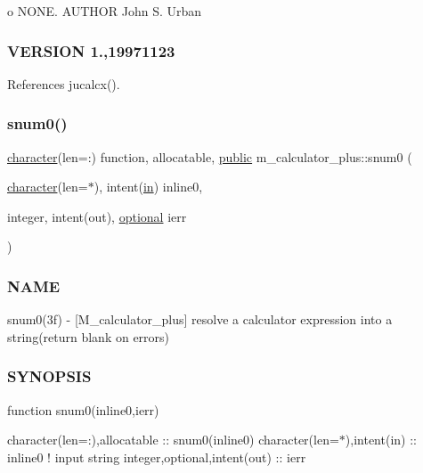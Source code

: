 o N\+O\+NE. A\+U\+T\+H\+OR John S. Urban \subsubsection*{V\+E\+R\+S\+I\+ON 1.,19971123}

References jucalcx().

\mbox{\label{namespacem__calculator__plus_a2538e7f9f0b810f7f8dbdd80fa2444b3}} 
\subsubsection{\texorpdfstring{snum0()}{snum0()}}
{\footnotesize\ttfamily \hyperlink{option__stopwatch_83_8txt_abd4b21fbbd175834027b5224bfe97e66}{character}(len=\+:) function, allocatable, \hyperlink{M__stopwatch_83_8txt_a2f74811300c361e53b430611a7d1769f}{public} m\+\_\+calculator\+\_\+plus\+::snum0 (\begin{DoxyParamCaption}\item[{\hyperlink{option__stopwatch_83_8txt_abd4b21fbbd175834027b5224bfe97e66}{character}(len=$\ast$), intent(\hyperlink{M__journal_83_8txt_afce72651d1eed785a2132bee863b2f38}{in})}]{inline0,  }\item[{integer, intent(out), \hyperlink{option__stopwatch_83_8txt_aa4ece75e7acf58a4843f70fe18c3ade5}{optional}}]{ierr }\end{DoxyParamCaption})}



\subsubsection*{N\+A\+ME}

snum0(3f) -\/ \mbox{[}M\+\_\+calculator\+\_\+plus\mbox{]} resolve a calculator expression into a string(return blank on errors) 

\subsubsection*{S\+Y\+N\+O\+P\+S\+IS}

function snum0(inline0,ierr)

character(len=\+:),allocatable \+:\+: snum0(inline0) character(len=$\ast$),intent(in) \+:\+: inline0 ! input string integer,optional,intent(out) \+:\+: ierr

